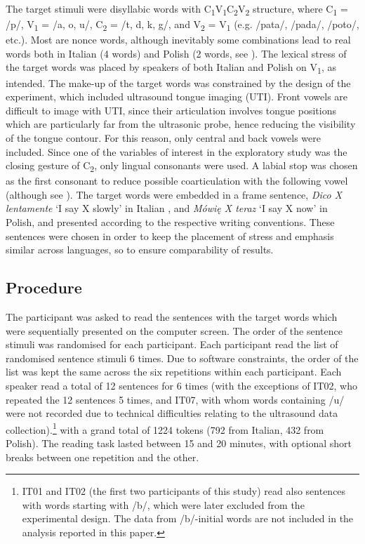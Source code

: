 \documentclass[preprint]{JASAnew}
\begin{document}
The target stimuli were disyllabic words with
C\textsubscript{1}V\textsubscript{1}C\textsubscript{2}V\textsubscript{2}
structure, where C\textsubscript{1} = /p/, V\textsubscript{1} = /a, o,
u/, C\textsubscript{2} = /t, d, k, g/, and V\textsubscript{2} =
V\textsubscript{1} (e.g. /pata/, /pada/, /poto/, etc.). Most are nonce
words, although inevitably some combinations lead to real words both in
Italian (4 words) and Polish (2 words, see ). The
lexical stress of the target words was placed by speakers of both
Italian and Polish on V\textsubscript{1}, as intended. The make-up of
the target words was constrained by the design of the experiment, which
included ultrasound tongue imaging (UTI). Front vowels are difficult to
image with UTI, since their articulation involves tongue positions which
are particularly far from the ultrasonic probe, hence reducing the
visibility of the tongue contour. For this reason, only central and back
vowels were included. Since one of the variables of interest in the
exploratory study was the closing gesture of C\textsubscript{2}, only
lingual consonants were used. A labial stop was chosen as the first
consonant to reduce possible coarticulation with the following vowel
(although see \citealt{vazquez-alvarez2007}). The target words were
embedded in a frame sentence, \emph{Dico X lentamente} `I say X slowly'
in Italian \citep[following][]{hajek2008}, and \emph{Mówię X teraz} `I
say X now' in Polish, and presented according to the respective writing
conventions. These sentences were chosen in order to keep the placement
of stress and emphasis similar across languages, so to ensure
comparability of results.

\hypertarget{procedure}{%
\subsection{Procedure}\label{procedure}}

The participant was asked to read the sentences with the target words
which were sequentially presented on the computer screen. The order of
the sentence stimuli was randomised for each participant. Each
participant read the list of randomised sentence stimuli 6 times. Due to
software constraints, the order of the list was kept the same across the
six repetitions within each participant. Each speaker read a total of 12
sentences for 6 times (with the exceptions of IT02, who repeated the 12
sentences 5 times, and IT07, with whom words containing /u/ were not
recorded due to technical difficulties relating to the ultrasound data
collection).\footnote{IT01 and IT02 (the first two participants of this study) read also sentences with words starting with /b/, which were later excluded from the experimental design. The data from /b/-initial words are not included in the analysis reported in this paper.}
with a grand total of 1224 tokens (792 from Italian, 432 from Polish).
The reading task lasted between 15 and 20 minutes, with optional short
breaks between one repetition and the other.
\end{document}
